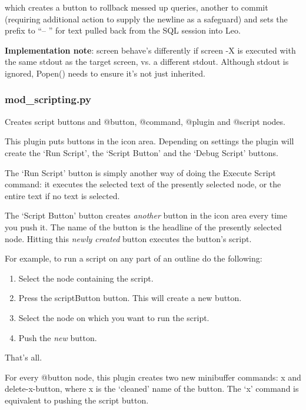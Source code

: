 \documentclass[a4paper,10pt,english]{sphinxmanual}
\begin{document}
which creates a button to rollback messed up queries, another to commit
(requiring additional action to supply the newline as a safeguard) and
sets the prefix to ``-- '' for text pulled back from the SQL session into
Leo.

\textbf{Implementation note}: screen behave's differently if screen -X is executed
with the same stdout as the target screen, vs. a different stdout. Although
stdout is ignored, Popen() needs to ensure it's not just inherited.


\subsubsection{mod\_scripting.py}
\label{plugins:mod-scripting-py}
Creates script buttons and @button, @command, @plugin and @script
nodes.

This plugin puts buttons in the icon area. Depending on settings the plugin will
create the `Run Script', the `Script Button' and the `Debug Script' buttons.

The `Run Script' button is simply another way of doing the Execute Script
command: it executes the selected text of the presently selected node, or the
entire text if no text is selected.

The `Script Button' button creates \emph{another} button in the icon area every time
you push it. The name of the button is the headline of the presently selected
node. Hitting this \emph{newly created} button executes the button's script.

For example, to run a script on any part of an outline do the following:
\begin{enumerate}
\item {} 
Select the node containing the script.

\item {} 
Press the scriptButton button.  This will create a new button.

\item {} 
Select the node on which you want to run the script.

\item {} 
Push the \emph{new} button.

\end{enumerate}

That's all.

For every @button node, this plugin creates two new minibuffer commands: x and
delete-x-button, where x is the `cleaned' name of the button. The `x' command is
equivalent to pushing the script button.
\end{document}

